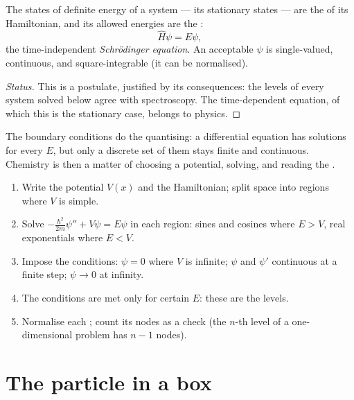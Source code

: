 \begin{theorem}\label{thm:b3:quantum-model-systems:schrodinger}
The states of definite energy of a system --- its stationary states --- are
the  of its Hamiltonian, and its allowed energies are the
:
\[
\hat H\psi = E\psi,
\]
the time-independent \emph{Schrödinger equation}.
An acceptable $\psi$ is single-valued, continuous, and
square-integrable (it can be normalised).
\end{theorem}
\begin{proof}[Status]
This is a postulate, justified by its consequences: the levels of every
system solved below agree with spectroscopy. The time-dependent equation,
of which this is the stationary case, belongs to physics.
\end{proof}

The boundary conditions do the quantising: a differential equation has
solutions for every $E$, but only a discrete set of them stays finite and
continuous. Chemistry is then a matter of choosing a potential, solving,
and reading the .

\begin{method}\label{met:b3:quantum-model-systems:one-dimensional}
\begin{enumerate}
  \item Write the potential $V(x)$ and the Hamiltonian; split space into
        regions where $V$ is simple.
  \item Solve $-\frac{\hbar^2}{2m}\psi'' + V\psi = E\psi$ in each region: sines
        and cosines where $E > V$, real exponentials where $E < V$.
  \item Impose the conditions: $\psi = 0$ where $V$ is infinite; $\psi$
        and $\psi'$ continuous at a finite step; $\psi \to 0$ at infinity.
  \item The conditions are met only for certain $E$: these are the levels.
  \item Normalise each ; count its nodes as a check (the
        $n$-th level of a one-dimensional problem has $n - 1$ nodes).
\end{enumerate}
\end{method}

\section{The particle in a box}

